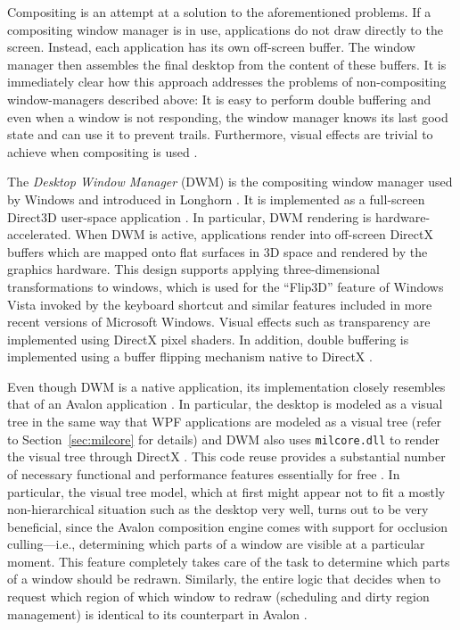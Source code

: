 			Compositing is an attempt at a solution to the aforementioned
			problems.  If a compositing window manager is in use, applications
			do not draw directly to the screen. Instead, each application has
			its own off-screen buffer. The
			window manager then assembles the final
			desktop from the content of these buffers. It is immediately clear how this approach addresses the
			problems of non-compositing window-managers described above: It is
			easy to perform double buffering and even when a window is not
			responding, the window manager knows its last good state and can
			use it to prevent trails. Furthermore, visual effects are trivial
			to achieve when compositing is used \cite{dwmoverview}.

		\label{sec:dwm}
			The \emph{Desktop Window Manager} (DWM) is the compositing window
			manager used by Windows and introduced in Longhorn
			\cite{dwmoverview}. It is implemented as a full-screen Direct3D
			user-space application \cite{dwmdirectx}. In particular, DWM rendering is
			hardware-accelerated. When DWM is active, applications render into
			off-screen DirectX buffers which are mapped onto flat surfaces in
			3D space and rendered by the graphics hardware. This design supports
			applying three-dimensional transformations to windows,
			which is used for the
			\enquote{Flip3D} feature of Windows Vista invoked by the keyboard
			shortcut  and similar features included in more
			recent versions of Microsoft Windows. Visual effects such as
			transparency are implemented using DirectX pixel shaders. In addition,
			double buffering is implemented using a buffer flipping mechanism
			native to DirectX \cite{dwmdirectx}.

			Even though DWM is a native application, its implementation closely
			resembles that of an Avalon application \cite{dwmwpf}. In particular, the desktop
			is modeled as a visual tree in the same way that WPF applications
			are modeled as a visual tree (refer to Section~\ref{sec:milcore}
			for details) and DWM also uses \texttt{milcore.dll} to render the
			visual tree through DirectX \cite{goingdeep}. This code reuse provides a
			substantial number of necessary functional and performance
			features essentially for free \cite{dwmwpf}.  In particular, the visual tree
			model, which at first might appear not to fit a mostly
			non-hierarchical situation such as the desktop very well,
			turns out to be very beneficial, since the Avalon composition
			engine comes with support for occlusion culling---i.e.,
			determining which parts of a window are visible at a particular
			moment. This feature completely takes care of the task to
			determine which parts of a window should be redrawn. Similarly, the
			entire logic that decides when to request which region of which window
			to redraw (scheduling and dirty region management) is identical to
			its counterpart in Avalon \cite{dwmwpf}.

